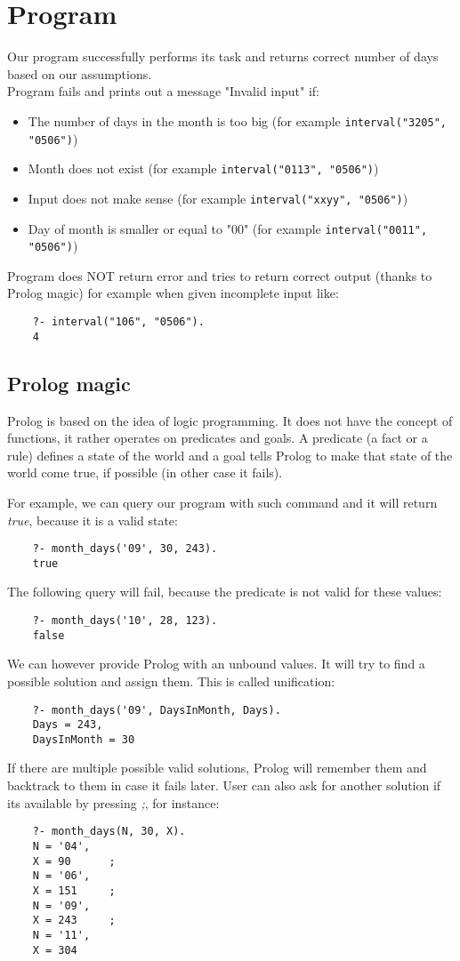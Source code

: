 \documentclass{article}[12pt]
\begin{document}
\section{Program}
Our program successfully performs its task and returns correct number of days based on our assumptions. \\
Program fails and prints out a message "Invalid input" if:
\begin{itemize}
    \item The number of days in the month is too big (for example \lstinline{interval("3205", "0506")})
    \item Month does not exist (for example \lstinline{interval("0113", "0506")})
    \item Input does not make sense (for example \lstinline{interval("xxyy", "0506")})
    \item Day of month is smaller or equal to "00" (for example \lstinline{interval("0011", "0506")})
\end{itemize} 

Program does NOT return error and tries to return correct output (thanks to Prolog magic) for example when given incomplete input like:
\begin{lstlisting}
    ?- interval("106", "0506").
    4
\end{lstlisting}

\subsection{Prolog magic}
Prolog is based on the idea of logic programming. It does not have the concept of functions, it rather operates on predicates and goals. A predicate (a fact or a rule) defines a state of the world and a goal tells Prolog to make that state of the world come true, if possible (in other case it fails).

For example, we can query our program with such command and it will return \emph{true}, because it is a valid state:
\begin{lstlisting}
    ?- month_days('09', 30, 243).
    true
\end{lstlisting}
The following query will fail, because the predicate is not valid for these values:
\begin{lstlisting}
    ?- month_days('10', 28, 123).
    false
\end{lstlisting}
We can however provide Prolog with an unbound values. It will try to find a possible solution and assign them. This is called unification:
\begin{lstlisting}
    ?- month_days('09', DaysInMonth, Days).
    Days = 243,
    DaysInMonth = 30
\end{lstlisting}
If there are multiple possible valid solutions, Prolog will remember them and backtrack to them in case it fails later. User can also ask for another solution if its available by pressing \emph{;}, for instance:
\begin{lstlisting}
    ?- month_days(N, 30, X).
    N = '04',
    X = 90      ;
    N = '06',
    X = 151     ;
    N = '09',
    X = 243     ;
    N = '11',
    X = 304
\end{lstlisting}
\end{document}
